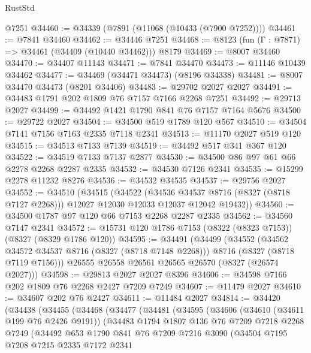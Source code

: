 \begin{lexlean}{RustStd}
\begin{coremodule}
    @7251
@34460 := @34339 (@7891 (@11068 (@10433 (@7900 @7252))))
@34461 := @7841 @34460
@34462 := @34446 @7251
@34468 := @8123 (fun (Γ : @7871) => @34461 (@34409 (@10440 @34462))) @8179
@34469 := @8007 @34460
@34470 := @34407 @11143
@34471 := @7841 @34470
@34473 := @11146 @10439 @34462
@34477 := @34469 (@34471 @34473) (@8196 @34338)
@34481 := @8007 @34470 @34473 (@8201 @34406)
@34483 := @29702 @2027 @2027
@34491 := @34483 @1791 @202 @1809 @76 @7157 @7166 @2268 @7251
@34492 := @29713 @2027
@34499 := @34492 @1421 @1790 @841 @76 @7157 @7164 @5676
@34500 := @29722 @2027
@34504 := @34500 @519 @1789 @120 @567
@34510 := @34504 @7141 @7156 @7163 @2335 @7118 @2341
@34513 := @11170 @2027 @519 @120
@34515 := @34513 @7133 @7139
@34519 := @34492 @517 @341 @367 @120
@34522 := @34519 @7133 @7137 @2877
@34530 := @34500 @86 @97 @61 @66 @2278 @2268 @2287 @2335
@34532 := @34530 @7126 @2341
@34535 := @15299 @2278 @11232 @8276
@34536 := @34532 @34535
@34537 := @29756 @2027
@34552 := @34510
    (@34515
      (@34522
        (@34536 @34537 @8716 (@8327 (@8718 @7127 @2268)))
        @12027
        @12030
        @12033
        @12037
        @12042
        @19432))
@34560 := @34500 @1787 @97 @120 @66 @7153 @2268 @2287 @2335
@34562 := @34560 @7147 @2341
@34572 := @15731 @120 @1786 @7153 (@8322 (@8323 @7153)) (@8327 (@8329 @1786 @120))
@34595 := @34491
    (@34499
      (@34552
        (@34562 @34572 @34537 @8716 (@8327 (@8718 @7148 @2268)))
        @8716
        (@8327 (@8718 @7119 @7156)))
      @26555
      @26558
      @26561
      @26565
      @26570
      (@8327 (@26574 @2027)))
@34598 := @29813 @2027 @2027 @8396
@34606 := @34598 @7166 @202 @1809 @76 @2268 @2427 @7209 @7249
@34607 := @11479 @2027
@34610 := @34607 @202 @76 @2427
@34611 := @11484 @2027
@34814 := @34420
    (@34438
      (@34455
        (@34468
          (@34477
            (@34481
              (@34595
                (@34606
                  (@34610 (@34611 @199 @76 @2426 @9191))
                  (@34483
                    @1794
                    @1807
                    @136
                    @76
                    @7209
                    @7218
                    @2268
                    @7249
                    (@34492
                      @653
                      @1790
                      @841
                      @76
                      @7209
                      @7216
                      @3090
                      (@34504
                        @7195
                        @7208
                        @7215
                        @2335
                        @7172
                        @2341

\end{coremodule}
\end{lexlean}
